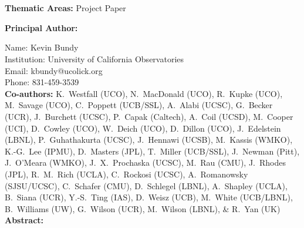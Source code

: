 \documentclass[oneside,12pt]{amsart}
\begin{document}
 \\[20pt]
\\

\noindent \textbf{Thematic Areas:} Project Paper
  
\noindent \textbf{Principal Author:}

\noindent Name:	Kevin Bundy \\
\noindent Institution:  University of California Observatories \\
\noindent Email:  kbundy@ucolick.org \\
\noindent Phone:  831-459-3539 \\
 
\noindent \textbf{Co-authors:} {\footnotesize K.~Westfall (UCO), N.~MacDonald (UCO), R.~Kupke
(UCO), M.~Savage (UCO),
C.~Poppett (UCB/SSL), A.~Alabi (UCSC), G.~Becker
(UCR), J.~Burchett (UCSC), P.~Capak (Caltech), A.~Coil (UCSD),
M.~Cooper (UCI), D.~Cowley (UCO), W.~Deich (UCO), D.~Dillon (UCO),
J.~Edelstein (LBNL), P.~Guhathakurta (UCSC), J.~Hennawi (UCSB), M.~Kassis (WMKO),
K.-G.~Lee (IPMU), D.~Masters (JPL), T.~Miller (UCB/SSL), J.~Newman
(Pitt), J.~O'Meara (WMKO), J.~X.~Prochaska (UCSC), M.~Rau (CMU), J.~Rhodes (JPL), R.~M.~Rich (UCLA),
C.~Rockosi (UCSC), A.~Romanowsky (SJSU/UCSC), C.~Schafer (CMU), D.~Schlegel (LBNL),
A.~Shapley (UCLA), B.~Siana (UCR), Y.-S.~Ting (IAS), D.~Weisz
(UCB), M.~White (UCB/LBNL), B.~Williams (UW), G.~Wilson (UCR),
M.~Wilson (LBNL), \& R.~Yan (UK)} \\

\noindent \textbf{Abstract:} 
\end{document}
